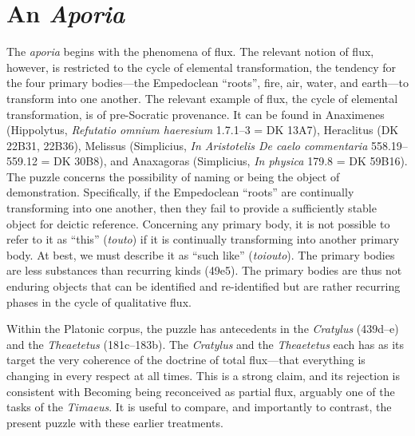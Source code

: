 
\section{An \emph{Aporia}} %
\label{sec:an_emph_aporia}

The \emph{aporia} begins with the phenomena of flux. The relevant notion of flux, however, is restricted to the cycle of elemental transformation, the tendency for the four primary bodies---the Empedoclean ``roots'', fire, air, water, and earth---to transform into one another. The relevant example of flux, the cycle of elemental transformation, is of pre-Socratic provenance. It can be found in Anaximenes (Hippolytus, \emph{Refutatio omnium haeresium} 1.7.1--3 = DK 13A7), Heraclitus (DK 22B31, 22B36), Melissus (Simplicius, \emph{In Aristotelis De caelo commentaria} 558.19--559.12 = DK 30B8), and Anaxagoras (Simplicius, \emph{In physica} 179.8 = DK 59B16). The puzzle concerns the possibility of naming or being the object of demonstration. Specifically, if the Empedoclean ``roots'' are continually transforming into one another, then they fail to provide a sufficiently stable object for deictic reference. Concerning any primary body, it is not possible to refer to it as ``this'' (\emph{touto}) if it is continually transforming into another primary body. At best, we must describe it as ``such like'' (\emph{toiouto}). The primary bodies are less substances than recurring kinds (49e5). The primary bodies are thus not enduring objects that can be identified and re-identified but are rather recurring phases in the cycle of qualitative flux.

Within the Platonic corpus, the puzzle has antecedents in the \emph{Cratylus} (439d--e) and the \emph{Theaetetus} (181c--183b). The \emph{Cratylus} and the \emph{Theaetetus} each has as its target the very coherence of the doctrine of total flux---that everything is changing in every respect at all times. This is a strong claim, and its rejection is consistent with Becoming being reconceived as partial flux, arguably one of the tasks of the \emph{Timaeus}. It is useful to compare, and importantly to contrast, the present puzzle with these earlier treatments. 

